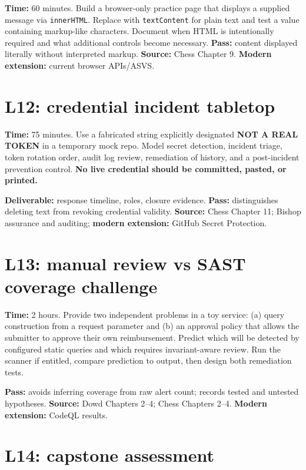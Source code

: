 \documentclass[
  letterpaper,
]{article}
\begin{document}
\textbf{Time:} 60 minutes. Build a browser-only practice page that
displays a supplied message via \texttt{innerHTML}. Replace with
\texttt{textContent} for plain text and test a value containing
markup-like characters. Document when HTML is intentionally required and
what additional controls become necessary. \textbf{Pass:} content
displayed literally without interpreted markup. \textbf{Source:} Chess
Chapter 9. \textbf{Modern extension:} current browser APIs/ASVS.

\section{L12: credential incident
tabletop}\label{l12-credential-incident-tabletop}

\textbf{Time:} 75 minutes. Use a fabricated string explicitly designated
\textbf{NOT A REAL TOKEN} in a temporary mock repo. Model secret
detection, incident triage, token rotation order, audit log review,
remediation of history, and a post-incident prevention control.
\textbf{No live credential should be committed, pasted, or printed.}

\textbf{Deliverable:} response timeline, roles, closure evidence.
\textbf{Pass:} distinguishes deleting text from revoking credential
validity. \textbf{Source:} Chess Chapter 11; Bishop assurance and
auditing; \textbf{modern extension:} GitHub Secret Protection.

\section{L13: manual review vs SAST coverage
challenge}\label{l13-manual-review-vs-sast-coverage-challenge}

\textbf{Time:} 2 hours. Provide two independent problems in a toy
service: (a) query construction from a request parameter and (b) an
approval policy that allows the submitter to approve their own
reimbursement. Predict which will be detected by configured static
queries and which requires invariant-aware review. Run the scanner if
entitled, compare prediction to output, then design both remediation
tests.

\textbf{Pass:} avoids inferring coverage from raw alert count; records
tested and untested hypotheses. \textbf{Source:} Dowd Chapters 2--4;
Chess Chapters 2--4. \textbf{Modern extension:} CodeQL results.

\section{L14: capstone assessment}\label{l14-capstone-assessment}
\end{document}
